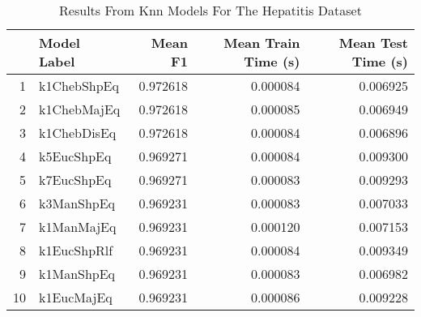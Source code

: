 \begin{table}
\centering
\caption{Results From Knn Models For The Hepatitis Dataset}
\label{tab:knn_results_hepatitis}
\begin{tabular}{rlrrr}
\toprule
 & Model Label & Mean F1 & Mean Train Time (s) & Mean Test Time (s) \\
\midrule
1 & k1ChebShpEq & 0.972618 & 0.000084 & 0.006925 \\
2 & k1ChebMajEq & 0.972618 & 0.000085 & 0.006949 \\
3 & k1ChebDisEq & 0.972618 & 0.000084 & 0.006896 \\
4 & k5EucShpEq & 0.969271 & 0.000084 & 0.009300 \\
5 & k7EucShpEq & 0.969271 & 0.000083 & 0.009293 \\
6 & k3ManShpEq & 0.969231 & 0.000083 & 0.007033 \\
7 & k1ManMajEq & 0.969231 & 0.000120 & 0.007153 \\
8 & k1EucShpRlf & 0.969231 & 0.000084 & 0.009349 \\
9 & k1ManShpEq & 0.969231 & 0.000083 & 0.006982 \\
10 & k1EucMajEq & 0.969231 & 0.000086 & 0.009228 \\
\bottomrule
\end{tabular}
\end{table}
